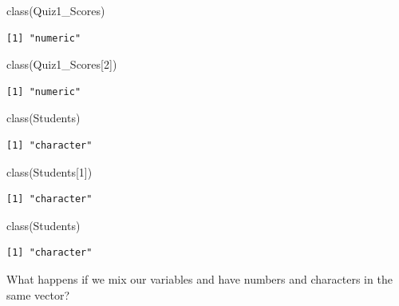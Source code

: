 \documentclass[
  letterpaper,
  DIV=11,
  numbers=noendperiod]{scrreprt}
\newenvironment{Shaded}{\begin{snugshade}}{\end{snugshade}}
\newcommand{\DecValTok}[1]{\textcolor[rgb]{0.68,0.00,0.00}{#1}}
\newcommand{\FunctionTok}[1]{\textcolor[rgb]{0.28,0.35,0.67}{#1}}
\newcommand{\NormalTok}[1]{\textcolor[rgb]{0.00,0.23,0.31}{#1}}
\begin{document}
\begin{Shaded}
\begin{Highlighting}[]
\FunctionTok{class}\NormalTok{(Quiz1\_Scores)}
\end{Highlighting}
\end{Shaded}

\begin{verbatim}
[1] "numeric"
\end{verbatim}

\begin{Shaded}
\begin{Highlighting}[]
\FunctionTok{class}\NormalTok{(Quiz1\_Scores[}\DecValTok{2}\NormalTok{])}
\end{Highlighting}
\end{Shaded}

\begin{verbatim}
[1] "numeric"
\end{verbatim}

\begin{Shaded}
\begin{Highlighting}[]
\FunctionTok{class}\NormalTok{(Students)}
\end{Highlighting}
\end{Shaded}

\begin{verbatim}
[1] "character"
\end{verbatim}

\begin{Shaded}
\begin{Highlighting}[]
\FunctionTok{class}\NormalTok{(Students[}\DecValTok{1}\NormalTok{])}
\end{Highlighting}
\end{Shaded}

\begin{verbatim}
[1] "character"
\end{verbatim}

\begin{Shaded}
\begin{Highlighting}[]
\FunctionTok{class}\NormalTok{(Students)}
\end{Highlighting}
\end{Shaded}

\begin{verbatim}
[1] "character"
\end{verbatim}

What happens if we mix our variables and have numbers and characters in
the same vector?
\end{document}
